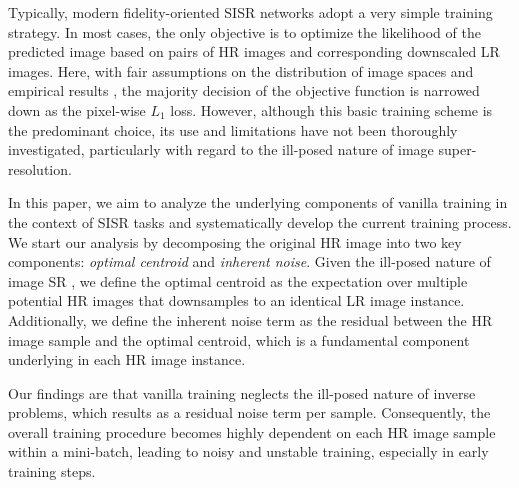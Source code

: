 \documentclass[letterpaper]{article} %
\begin{document}
Typically, modern fidelity-oriented SISR networks adopt a very simple training strategy. In most cases, the only objective is to optimize the likelihood of the predicted image based on pairs of HR images and corresponding downscaled LR images. Here, with fair assumptions on the distribution of image spaces and empirical results \cite{SISR2_EDSR}, the majority decision of the objective function is narrowed down as the pixel-wise $L_1$ loss. However, although this basic training scheme is the predominant choice, its use and limitations have not been thoroughly investigated, particularly with regard to the ill-posed nature of image super-resolution. 

In this paper, we aim to analyze the underlying components of vanilla training in the context of SISR tasks and systematically develop the current training process. We start our analysis by decomposing the original HR image into two key components: \textit{optimal centroid} and \textit{inherent noise}. Given the ill-posed nature of image SR  \cite{hyun2020varsr, SISR9_SRFlow}, we define the optimal centroid as the expectation over multiple potential HR images that downsamples to an identical LR image instance. Additionally, we define the inherent noise term as the residual between the HR image sample and the optimal centroid, which is a fundamental component underlying in each HR image instance.

Our findings are that vanilla training neglects the ill-posed nature of inverse problems, which results as a residual noise term per sample.
Consequently, the overall training procedure becomes highly dependent on each HR image sample within a mini-batch, leading to noisy and unstable training, especially in early training steps.
\end{document}
